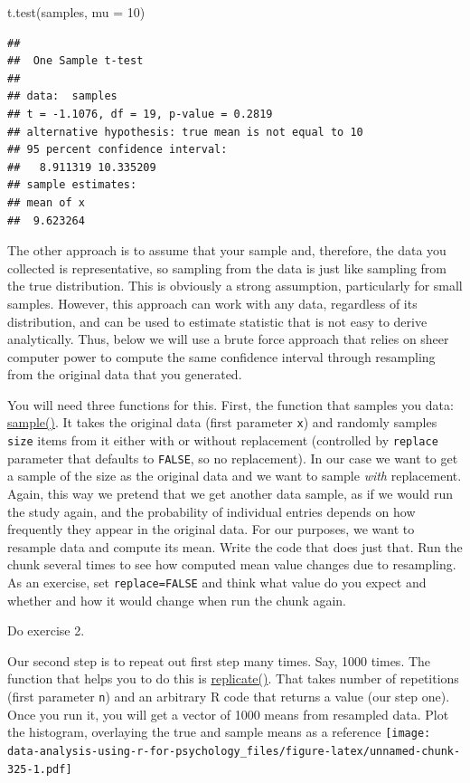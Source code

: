 \documentclass[
]{book}
\newenvironment{Shaded}{\begin{snugshade}}{\end{snugshade}}
\newcommand{\AttributeTok}[1]{\textcolor[rgb]{0.77,0.63,0.00}{#1}}
\newcommand{\DecValTok}[1]{\textcolor[rgb]{0.00,0.00,0.81}{#1}}
\newcommand{\FunctionTok}[1]{\textcolor[rgb]{0.00,0.00,0.00}{#1}}
\newcommand{\NormalTok}[1]{#1}
\begin{document}
\begin{Shaded}
\begin{Highlighting}[]
\FunctionTok{t.test}\NormalTok{(samples, }\AttributeTok{mu =} \DecValTok{10}\NormalTok{)}
\end{Highlighting}
\end{Shaded}

\begin{verbatim}
## 
##  One Sample t-test
## 
## data:  samples
## t = -1.1076, df = 19, p-value = 0.2819
## alternative hypothesis: true mean is not equal to 10
## 95 percent confidence interval:
##   8.911319 10.335209
## sample estimates:
## mean of x 
##  9.623264
\end{verbatim}

The other approach is to assume that your sample and, therefore, the data you collected is representative, so sampling from the data is just like sampling from the true distribution. This is obviously a strong assumption, particularly for small samples. However, this approach can work with any data, regardless of its distribution, and can be used to estimate statistic that is not easy to derive analytically. Thus, below we will use a brute force approach that relies on sheer computer power to compute the same confidence interval through resampling from the original data that you generated.

You will need three functions for this. First, the function that samples you data: \href{https://stat.ethz.ch/R-manual/R-devel/library/base/html/sample.html}{sample()}. It takes the original data (first parameter \texttt{x}) and randomly samples \texttt{size} items from it either with or without replacement (controlled by \texttt{replace} parameter that defaults to \texttt{FALSE}, so no replacement). In our case we want to get a sample of the size as the original data and we want to sample \emph{with} replacement. Again, this way we pretend that we get another data sample, as if we would run the study again, and the probability of individual entries depends on how frequently they appear in the original data. For our purposes, we want to resample data and compute its mean. Write the code that does just that. Run the chunk several times to see how computed mean value changes due to resampling. As an exercise, set \texttt{replace=FALSE} and think what value do you expect and whether and how it would change when run the chunk again.

Do exercise 2.

Our second step is to repeat out first step many times. Say, 1000 times. The function that helps you to do this is \href{https://stat.ethz.ch/R-manual/R-devel/library/base/html/lapply.html}{replicate()}. That takes number of repetitions (first parameter \texttt{n}) and an arbitrary R code that returns a value (our step one). Once you run it, you will get a vector of 1000 means from resampled data. Plot the histogram, overlaying the true and sample means as a reference
\texttt{[image: data-analysis-using-r-for-psychology\_files/figure-latex/unnamed-chunk-325-1.pdf]}
\end{document}
